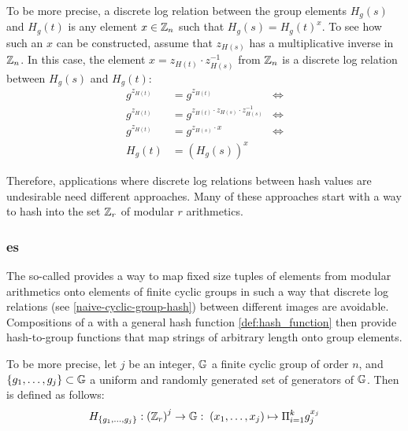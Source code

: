 \begin{example}
To be more precise, a discrete log relation between the group elements $H_g(s)$ and $H_g(t)$ is any element $x\in \mathbb{Z}_n$ such that $H_g(s) = H_g(t)^x$. To see how such an $x$ can be constructed, assume that $z_{H(s)}$ has a multiplicative inverse in $\mathbb{Z}_n$. In this case, the element $x=z_{H(t)}\cdot z_{H(s)}^{-1}$ from $\mathbb{Z}_n$ is a discrete log relation between $H_g(s)$ and $H_g(t)$:
\begin{align*}
g^{z_{H(t)}} & = g^{z_{H(t)}} & \Leftrightarrow\\
g^{z_{H(t)}} & = g^{z_{H(t)}\cdot z_{H(s)}\cdot z_{H(s)}^{-1}} & \Leftrightarrow \\
g^{z_{H(t)}} & = g^{z_{H(s)}\cdot x} & \Leftrightarrow \\
H_g(t) & = (H_g(s))^x
\end{align*}
\end{example}
Therefore, applications where discrete log relations between hash values are undesirable need different approaches. Many of these approaches start with a way to hash into the set $\mathbb{Z}_r$ of modular $r$ arithmetics.

\subsubsection{es}
\label{def:Pedersen_hash}
The so-called  \citep{Pedersen92} provides a way to map fixed size tuples of elements from modular arithmetics onto elements of finite cyclic groups in such a way that discrete log relations (see \examplename{} \ref{naive-cyclic-group-hash}) between different images are avoidable. Compositions of a  with a general hash function \eqref{def:hash_function} then provide hash-to-group functions that map strings of arbitrary length onto group elements.

To be more precise, let $j$ be an integer, $\mathbb{G}$ a finite cyclic group of order $n$, and $\{g_1, \ldots, g_j\} \subset \mathbb{G}$ a uniform and randomly generated set of generators of $\mathbb{G}$. Then  is defined as follows:
\begin{equation}\label{eq:Pedersen_hash}
H_{\{g_1,\ldots,g_j\}} : \left(\mathbb{Z}_r\right)^j \to \mathbb{G}:\; (x_1,\ldots,x_j)\mapsto \Pi_{i=1}^k g_j^{x_j}
\end{equation}

